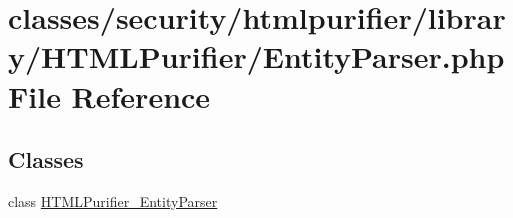 \hypertarget{EntityParser_8php}{\section{classes/security/htmlpurifier/library/\+H\+T\+M\+L\+Purifier/\+Entity\+Parser.php File Reference}
\label{EntityParser_8php}
}
\subsection*{Classes}
\begin{DoxyCompactItemize}
\item 
class \hyperlink{classHTMLPurifier__EntityParser}{H\+T\+M\+L\+Purifier\+\_\+\+Entity\+Parser}
\end{DoxyCompactItemize}
